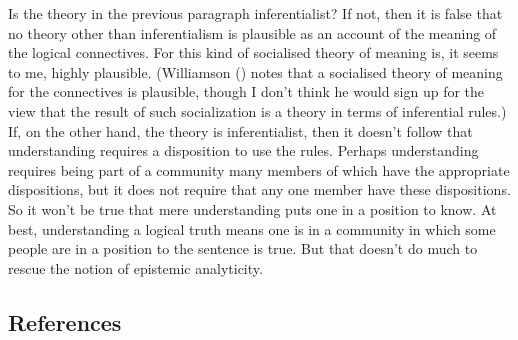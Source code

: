 \documentclass[
  11pt,
  letterpaper,
  DIV=11,
  numbers=noendperiod,
  twoside]{scrartcl}
\begin{document}
Is the theory in the previous paragraph inferentialist? If not, then it
is false that no theory other than inferentialism is plausible as an
account of the meaning of the logical connectives. For this kind of
socialised theory of meaning is, it seems to me, highly plausible.
(Williamson () notes that a
socialised theory of meaning for the connectives is plausible, though I
don't think he would sign up for the view that the result of such
socialization is a theory in terms of inferential rules.) If, on the
other hand, the theory is inferentialist, then it doesn't follow that
understanding requires a disposition to use the rules. Perhaps
understanding requires being part of a community many members of which
have the appropriate dispositions, but it does not require that any one
member have these dispositions. So it won't be true that mere
understanding puts one in a position to know. At best, understanding a
logical truth means one is in a community in which some people are in a
position to the sentence is true. But that doesn't do much to rescue the
notion of epistemic analyticity.

\subsection*{References}\label{references}
\end{document}
